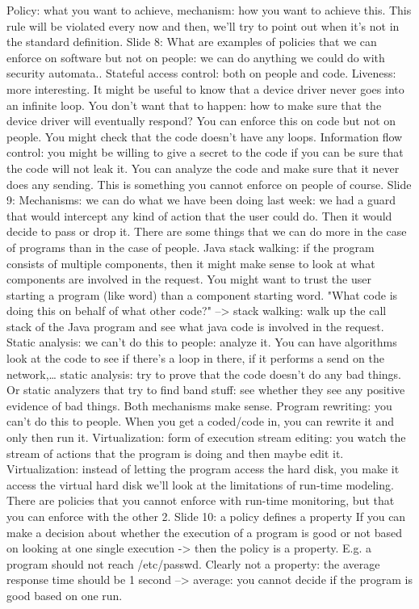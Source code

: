 \documentclass[10pt,a4paper]{report}
\begin{document}
Policy: what you want to achieve, mechanism: how you want to achieve this. This rule will be violated every now and then, we'll try to point out when it's not in the standard definition.
Slide 8: What are examples of policies that we can enforce on software but not on people: we can do anything we could do with security automata.. Stateful access control: both on people and code.
Liveness: more interesting. It might be useful to know that a device driver never goes into an infinite loop. You don't want that to happen: how to make sure that the device driver will eventually respond? You can enforce this on code but not on people. You might check that the code doesn't have any loops. 
Information flow control: you might be willing to give a secret to the code if you can be sure that the code will not leak it. You can analyze the code and make sure that it never does any sending. This is something you cannot enforce on people of course. 
Slide 9: Mechanisms: we can do what we have been doing last week: we had a guard that would intercept any kind of action that the user could do. Then it would decide to pass or drop it. 
There are some things that we can do more in the case of programs than in the case of people. 
Java stack walking: if the program consists of multiple components, then it might make sense to look at what components are involved in the request. You might want to trust the user starting a program (like word) than a component starting word. "What code is doing this on behalf of what other code?" --> stack walking: walk up the call stack of the Java program and see what java code is involved in the request. 
Static analysis: we can't do this to people: analyze it. You can have algorithms look at the code to see if there's a loop in there, if it performs a send on the network,… static analysis: try to prove that the code doesn't do any bad things. Or static analyzers that try to find band stuff: see whether they see any positive evidence of bad things.
Both mechanisms make sense.
Program rewriting: you can't do this to people. When you get a coded/code in, you can rewrite it and only then run it. Virtualization: form of execution stream editing: you watch the stream of actions that the program is doing and then maybe edit it. Virtualization: instead of letting the program access the hard disk, you make it access the virtual hard disk
we'll look at the limitations of run-time modeling. There are policies that you cannot enforce with run-time monitoring, but that you can enforce with the other 2.
Slide 10: a policy defines a property If you can make a decision about whether the execution of a program is good or not based on looking at one single execution -> then the policy is a property. E.g. a program should not reach /etc/passwd. Clearly not a property: the average response time should be 1 second --> average: you cannot decide if the program is good based on one run.
\end{document}

